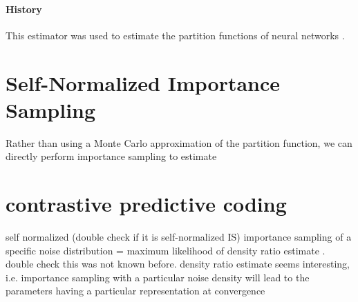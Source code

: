 \documentclass{article}
\begin{document}
\paragraph{History} This estimator was used to estimate the partition functions of neural networks \citep{is-nn}.

\section{Self-Normalized Importance Sampling}
Rather than using a Monte Carlo approximation of the partition function, we can directly perform importance sampling to estimate

\section{contrastive predictive coding}
self normalized (double check if it is self-normalized IS) importance sampling of a specific noise distribution = maximum likelihood of density ratio estimate \citep{miml}. double check this was not known before. density ratio estimate seems interesting, i.e. importance sampling with a particular noise density will lead to the parameters having a particular representation at convergence


\end{document}
